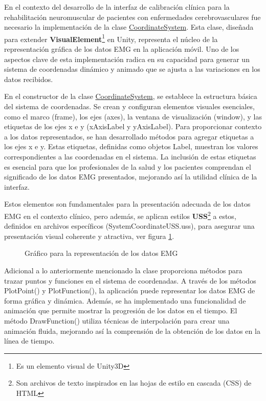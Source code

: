 En el contexto del desarrollo de la interfaz de calibración clínica para la rehabilitación neuromuscular de pacientes con enfermedades cerebrovasculares fue necesario la implementación de la clase \underline{CoordinateSystem}. Esta clase, diseñada para extender \textbf{VisualElement}\footnote{Es un elemento visual de Unity3D } en Unity, representa el núcleo de la representación gráfica de los datos EMG en la aplicación móvil. Uno de los aspectos clave de esta implementación radica en su capacidad para generar un sistema de coordenadas dinámico y animado que se ajusta a las variaciones en los datos recibidos.

\vspace{5pt}
En el constructor de la clase \underline{CoordinateSystem}, se establece la estructura básica del sistema de coordenadas. Se crean y configuran elementos visuales esenciales, como el marco (frame), los ejes (axes), la ventana de visualización (window), y las etiquetas de los ejes x e y (xAxisLabel y yAxisLabel). Para proporcionar contexto a los datos representados, se han desarrollado métodos para agregar etiquetas a los ejes x e y. Estas etiquetas, definidas como objetos Label, muestran los valores correspondientes a las coordenadas en el sistema. La inclusión de estas etiquetas es esencial para que los profesionales de la salud y los pacientes comprendan el significado de los datos EMG presentados, mejorando así la utilidad clínica de la interfaz. 
    
\vspace{5pt}
Estos elementos son fundamentales para la presentación adecuada de los datos EMG en el contexto clínico, pero además, se aplican estilos \textbf{USS}\footnote{Son archivos de texto inspirados en las hojas de estilo en cascada (CSS) de HTML} a estos, definidos en archivos específicos (SystemCoordinateUSS.uss), para asegurar una presentación visual coherente y atractiva, ver figura \ref{fig: graph-emg}.

\begin{figure}[ht]
    \centering
    \caption{Gráfico para la representación de los datos EMG}
    \label{fig: graph-emg}
\end{figure}

Adicional a lo anteriormente mencionado la clase proporciona métodos para trazar puntos y funciones en el sistema de coordenadas. A través de los métodos PlotPoint() y PlotFunction(), la aplicación puede representar los datos EMG de forma gráfica y dinámica. Además, se ha implementado una funcionalidad de animación que permite mostrar la progresión de los datos en el tiempo. El método DrawFunction() utiliza técnicas de interpolación para crear una animación fluida, mejorando así la comprensión de la obtención de los datos en la línea de tiempo.
